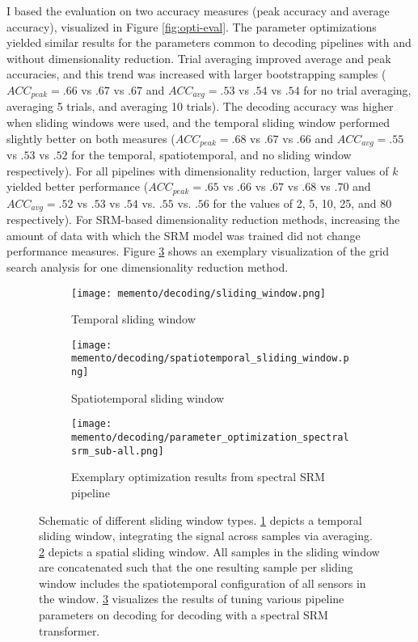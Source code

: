 I based the evaluation on two accuracy measures (peak accuracy and average accuracy), visualized in Figure \ref{fig:opti-eval}.
The parameter optimizations yielded similar results for the parameters common to decoding pipelines with and without dimensionality reduction.
Trial averaging improved average and peak accuracies, and this trend was increased with larger bootstrapping samples ($ACC_{peak} = .66$ vs $.67$ vs $.67$ and $ACC_{avg} = .53$ vs $.54$ vs $.54$ for no trial averaging, averaging 5 trials, and averaging 10 trials).
The decoding accuracy was higher when sliding windows were used, and the temporal sliding window performed slightly better on both measures ($ACC_{peak} = .68$ vs $.67$ vs $.66$ and $ACC_{avg} = .55$ vs $.53$ vs $.52$ for the temporal, spatiotemporal, and no sliding window respectively).
For all pipelines with dimensionality reduction, larger values of $k$ yielded better performance ($ACC_{peak} = .65$ vs $.66$ vs $.67$ vs $.68$ vs $.70$ and $ACC_{avg} = .52$ vs $.53$ vs $.54$ vs. $.55$ vs. $.56$ for the values of 2, 5, 10, 25, and 80 respectively).
For \gls{SRM}-based dimensionality reduction methods, increasing the amount of data with which the \gls{SRM} model was trained did not change performance measures.
Figure \ref{fig:decoding-opti-results} shows an exemplary visualization of the grid search analysis for one dimensionality reduction method.



\begin{figure}
	\centering
	\begin{subfigure}{.65\textwidth}
		\texttt{[image: memento/decoding/sliding\_window.png]}
		\caption{Temporal sliding window}
		\label{fig:temporal-slider}
	\end{subfigure}
	\newline
	\begin{subfigure}{0.39\textwidth}
		\texttt{[image: memento/decoding/spatiotemporal\_sliding\_window.png]}
		\caption{Spatiotemporal sliding window}
		\label{fig:spatiotemporal-slider}
	\end{subfigure}
	\begin{subfigure}{0.59\textwidth}
	\texttt{[image: memento/decoding/parameter\_optimization\_spectralsrm\_sub-all.png]}
	\caption{Exemplary optimization results from spectral SRM pipeline}
	\label{fig:decoding-opti-results}
\end{subfigure}
	\caption[Schematic of different sliding window types and optimization results]{Schematic of different sliding window types. \ref{fig:temporal-slider} depicts a temporal sliding window, integrating the signal across samples via averaging. \ref{fig:spatiotemporal-slider} depicts a spatial sliding window. All samples in the sliding window are concatenated such that the one resulting sample per sliding window includes the spatiotemporal configuration of all sensors in the window.
	\ref{fig:decoding-opti-results} visualizes the results of tuning various pipeline parameters on decoding for decoding with a spectral \gls{SRM} transformer.}
	\label{fig:sliding-windows}
\end{figure}

